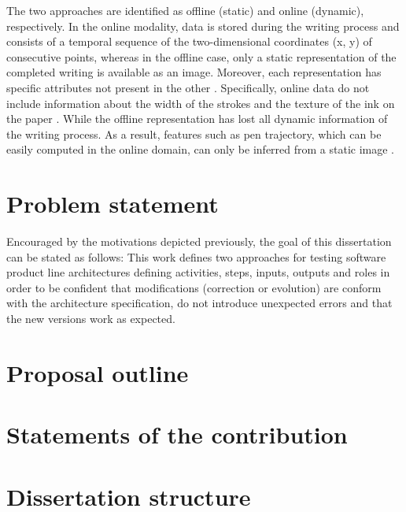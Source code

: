 The two approaches are identified as offline (static) and online (dynamic), respectively. In the online modality, data is stored during the writing process and consists of a temporal sequence of the two-dimensional coordinates (x, y) of consecutive points, whereas in the offline case, only a static representation of the completed writing is available as an image. Moreover, each representation has specific attributes not present in the other \cite{viard1999ireste}. Specifically, online data do not include information about the width of the strokes and the texture of the ink on the paper \cite{diaz2014generation}. While the offline representation has lost all dynamic information of the writing process. As a result, features such as pen trajectory, which can be easily computed in the online domain, can only be inferred from a static image \cite{nel2005estimating}.


\section{Problem statement}
Encouraged by the motivations depicted previously, the goal of this dissertation can be stated as follows:
This work defines two approaches for testing software product line architectures defining activities, steps, inputs, outputs and roles in order to be confident that modifications
(correction or evolution) are conform with the architecture specification, do not introduce unexpected errors and that the new versions work as expected.

\section{Proposal outline}

\section{Statements of the contribution}

\section{Dissertation structure}






